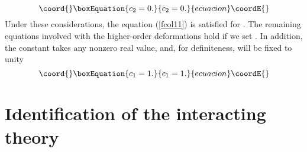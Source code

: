 \documentclass[a4paper,12pt]{article}
\begin{document}
\begin{equation}\coord{}\boxEquation{
c_{2}=0.  \label{fcola34}
}{
c_{2}=0.  }{ecuacion}\coordE{}\end{equation}
Under these considerations, the equation (\ref{fcol11}) is satisfied for \coordHE{}. The remaining equations involved with the higher-order
deformations hold if we set \coordHE{}. In addition, the
constant \coordHE{} takes any nonzero real value, and, for definiteness, will
be fixed to unity 
\begin{equation}\coord{}\boxEquation{
c_{1}=1.  \label{fcola37}
}{
c_{1}=1.  }{ecuacion}\coordE{}\end{equation}

\section{Identification of the interacting theory}
\end{document}
